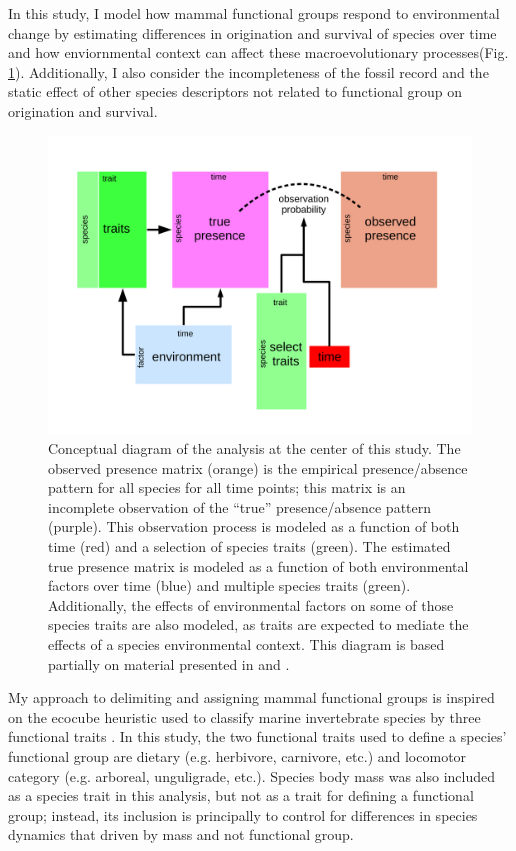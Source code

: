 \documentclass[12pt,letterpaper]{article}
\begin{document}
In this study, I model how mammal functional groups respond to environmental change by estimating differences in origination and survival of species over time and how enviornmental context can affect these macroevolutionary processes(Fig. \ref{fig:concept_fourth_corner}). Additionally, I also consider the incompleteness of the fossil record and the static effect of other species descriptors not related to functional group on origination and survival. 


\begin{figure}[ht]
  \centering
  \includegraphics[width=\textwidth,height=0.4\textheight,keepaspectratio=true]{figure/paleo_fourth_corner}
  \caption[Conceptual diagram of the analysis conducted in this study]{Conceptual diagram of the analysis at the center of this study. The observed presence matrix (orange) is the empirical presence/absence pattern for all species for all time points; this matrix is an incomplete observation of the ``true'' presence/absence pattern (purple). This observation process is modeled as a function of both time (red) and a selection of species traits (green). The estimated true presence matrix is modeled as a function of both environmental factors over time (blue) and multiple species traits (green). Additionally, the effects of environmental factors on some of those species traits are also modeled, as traits are expected to mediate the effects of a species environmental context. This diagram is based partially on material presented in \citet{Brown2014c} and \citet{Warton2015a}.}
  \label{fig:concept_fourth_corner}
\end{figure}

My approach to delimiting and assigning mammal functional groups is inspired on the ecocube heuristic used to classify marine invertebrate species by three functional traits \citep{Bush2007,Bambach2007,Bush2011,Bush2012b,Novack-Gottshall2007,Villeger2011}. In this study, the two functional traits used to define a species' functional group are dietary (e.g. herbivore, carnivore, etc.) and locomotor category (e.g. arboreal, unguligrade, etc.). Species body mass was also included as a species trait in this analysis, but not as a trait for defining a functional group; instead, its inclusion is principally to control for differences in species dynamics that driven by mass and not functional group.
\end{document}
